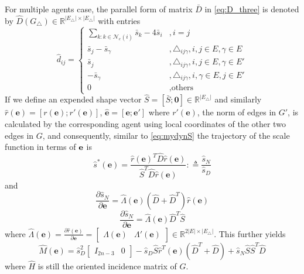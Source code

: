 \documentclass[times]{rncauth}
\newcommand{\be}{\ensuremath \mathbf{e}}
\begin{document}
For multiple agents case, the parallel form of matrix $\bar{D}$ in
\eqref{eq:D_three} is denoted by $\hat{D}(G_\triangle)\in
\mathbb{R}^{|E_\triangle|\times |E_\triangle|}$  with entries
\begin{equation*}
 \hat{d}_{ij}=\begin{cases}
\sum\limits_{k:k\in\mathcal{N}_e(i)} \bar{s}_k-4\bar{s}_i& ,i=j\\
\bar{s}_j-\bar{s}_{\gamma} &, \triangle_{ij\gamma},i,j\in E,\gamma \in E\\
\bar{s}_j &, \triangle_{ij\gamma},i,j\in E, \gamma \in E'\\
-\bar{s}_\gamma &, \triangle_{ij\gamma}, i,\gamma\in E, j\in E'\\
 0 &, \text{others}
\end{cases}
\end{equation*}
If we define an expended shape vector $\hat{S}=[\bar{S}
;\mathbf{0}]\in \mathbb{R}^{|E_\triangle|}$ and similarly
$\hat{r}(\mathbf{e})=[r(\mathbf{e});r'(\mathbf{e})]$,
$\hat{\mathbf{e}}=[\mathbf{e};\mathbf{e}']$ where $r'(\mathbf{e})$,
the norm of edges in $G'$, is calculated by the corresponding agent
using local coordinates of the other two edges in $G$, and
consequently, similar to \eqref{eq:mydynS} the trajectory of the
scale function in terms of $\be$ is
\begin{equation}\label{eq:dynamicS_multiple}
  \hat{s}^*(\mathbf{e})=\frac{\hat{r}(\mathbf{e})^T\hat{D}\hat{r}(\mathbf{e})}{\hat{S}^T\hat{D}\hat{r}(\mathbf{e})}:\triangleq
  \frac{\hat{s}_N}{\hat{s}_D}
\end{equation}
and
\begin{equation*}
  \frac{\partial \hat{s}_N}{\partial
  \mathbf{e}}=\hat{\Lambda}(\mathbf{e})(\hat{D}+\hat{D}^T)\hat{r}(\mathbf{e})
\end{equation*}
\begin{equation*}
   \frac{\partial \hat{s}_N}{\partial
  \mathbf{e}}=\hat{\Lambda}(\mathbf{e})\hat{D}^T \hat{S}
\end{equation*}
where $\hat{\Lambda}(\mathbf{e})=\frac{\partial
\hat{r}(\mathbf{e})}{\partial \mathbf{e}}=\begin{bmatrix}
\Lambda(\mathbf{e})&\Lambda'(\mathbf{e})
\end{bmatrix}\in \mathbb{R}^{2|E|\times |E_\triangle|}$.
This further yields
\begin{equation}\label{eq:M_multiple}
  \hat{M}(\mathbf{e})=\hat{s}_D^2\begin{bmatrix}I_{2n-3}
  &0\end{bmatrix}-\hat{s}_D\hat{S}\hat{r}^T(\mathbf{e})(\hat{D}^T+\hat{D})+\hat{s}_N\hat{S}
  \hat{S}^T\hat{D}
\end{equation}
where $\hat{H}$ is still the oriented incidence matrix of $G$.
\end{document}
